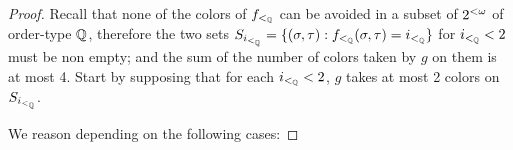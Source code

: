 \begin{proof}
  Recall that none of the colors of $f_{<_{\mathbb{Q}}}$ can be avoided in a subset of ${2^{<\omega}}$ of order-type $\mathbb{Q}$, therefore the two sets $S_{i_{<_{\mathbb{Q}}}}=\{(\sigma,\tau):f_{<_{\mathbb{Q}}}(\sigma,\tau)={i_{<_{\mathbb{Q}}}}\}$ for ${i_{<_{\mathbb{Q}}}}<2$ must be non empty; and the sum of the number of colors taken by $g$ on them is at most 4. Start by supposing that for each ${i_{<_{\mathbb{Q}}}}<2$, $g$ takes at most 2 colors on $S_{i_{<_{\mathbb{Q}}}}$.

  We reason depending on the following cases:
 
 
 
 
 

\end{proof}

